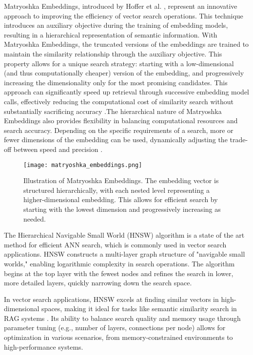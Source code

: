 \documentclass[a4paper, oneside]{discothesis}
\begin{document}
Matryoshka Embeddings, introduced by Hoffer et al. \cite{hoffer2018deep}, represent an innovative approach to improving the efficiency of vector search operations. This technique introduces an auxiliary objective during the training of embedding models, resulting in a hierarchical representation of semantic information. With Matryoshka Embeddings, the truncated versions of the embeddings are trained to maintain the similarity relationship through the auxiliary objective. This property allows for a unique search strategy: starting with a low-dimensional (and thus computationally cheaper) version of the embedding, and progressively increasing the dimensionality only for the most promising candidates. This approach can significantly speed up retrieval through successive embedding model calls, effectively reducing the computational cost of similarity search without substantially sacrificing accuracy \cite{hoffer2018deep}.The hierarchical nature of Matryoshka Embeddings also provides flexibility in balancing computational resources and search accuracy. Depending on the specific requirements of a search, more or fewer dimensions of the embedding can be used, dynamically adjusting the trade-off between speed and precision \cite{hoffer2018deep}.

\begin{figure}[h]
\centering
\texttt{[image: matryoshka\_embeddings.png]}
\caption{Illustration of Matryoshka Embeddings. The embedding vector is structured hierarchically, with each nested level representing a higher-dimensional embedding. This allows for efficient search by starting with the lowest dimension and progressively increasing as needed.}
\label{fig:matryoshka_embeddings}
\end{figure}

The Hierarchical Navigable Small World (HNSW) algorithm \cite{malkov2018efficient} is a state of the art method for efficient ANN search, which is commonly used in vector search applications. HNSW constructs a multi-layer graph structure of "navigable small worlds," enabling logarithmic complexity in search operations. The algorithm begins at the top layer with the fewest nodes and refines the search in lower, more detailed layers, quickly narrowing down the search space.

In vector search applications, HNSW excels at finding similar vectors in high-dimensional spaces, making it ideal for tasks like semantic similarity search in RAG systems \cite{johnson2019billion}. Its ability to balance search quality and memory usage through parameter tuning (e.g., number of layers, connections per node) allows for optimization in various scenarios, from memory-constrained environments to high-performance systems.
\end{document}
